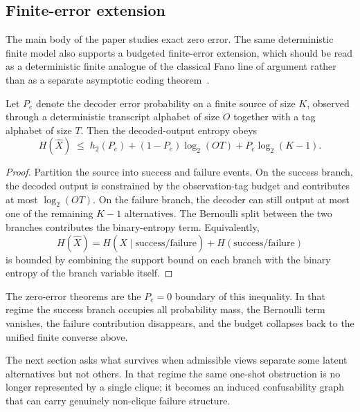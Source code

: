 \subsection{Finite-error extension}\label{sec:finite-error-extension}

The main body of the paper studies exact zero error. The same deterministic finite model also supports a budgeted finite-error extension, which should be read as a deterministic finite analogue of the classical Fano line of argument rather than as a separate asymptotic coding theorem~\cite{fano1961transmission,witsenhausen1975conditional,cover2006elements}.

\begin{proposition}\label{thm:finite-error-budgeted}
Let $P_e$ denote the decoder error probability on a finite source of size $K$, observed through a deterministic transcript alphabet of size $O$ together with a tag alphabet of size $T$. Then the decoded-output entropy obeys
\[
H(\hat X)
\;\le\;
h_2(P_e) + (1-P_e)\log_2 (OT) + P_e \log_2 (K-1).
\]
\end{proposition}

\begin{proof}
Partition the source into success and failure events. On the success branch, the decoded output is constrained by the observation-tag budget and contributes at most $\log_2(OT)$. On the failure branch, the decoder can still output at most one of the remaining $K-1$ alternatives. The Bernoulli split between the two branches contributes the binary-entropy term. Equivalently,
\[
H(\hat X)=H(\hat X \mid \text{success/failure}) + H(\text{success/failure})
\]
is bounded by combining the support bound on each branch with the binary entropy of the branch variable itself.
\end{proof}

The zero-error theorems are the $P_e=0$ boundary of this inequality. In that regime the success branch occupies all probability mass, the Bernoulli term vanishes, the failure contribution disappears, and the budget collapses back to the unified finite converse above.

The next section asks what survives when admissible views separate some latent alternatives but not others. In that regime the same one-shot obstruction is no longer represented by a single clique; it becomes an induced confusability graph that can carry genuinely non-clique failure structure.
